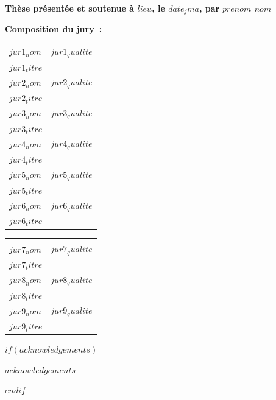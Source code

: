 \documentclass[12pt,a4paper]{reedthesis}
\begin{document}
\begin{titlepage}
\vspace{10mm}

\textbf{Thèse présentée et soutenue à $lieu$, le $date_jma$, par}
\bigskip
\Large {\color{Prune} \textbf{$prenom$ $nom$}}

\vspace{15mm}

\flushleft \normalsize \textbf{Composition du jury~:}
\bigskip

\scriptsize
{}
\begin{tabular}{|p{8cm}l}
\textbf{$jur1_nom$} &  $jur1_qualite$\\
$jur1_titre$ & \\
\textbf{$jur2_nom$} &  $jur2_qualite$\\
$jur2_titre$ & \\
\textbf{$jur3_nom$} &  $jur3_qualite$\\
$jur3_titre$ & \\
\textbf{$jur4_nom$} &  $jur4_qualite$\\
$jur4_titre$ & \\
\textbf{$jur5_nom$} &  $jur5_qualite$\\
$jur5_titre$ & \\
\textbf{$jur6_nom$} &  $jur6_qualite$\\
$jur6_titre$ & \\
\end{tabular}

\begin{tabular}{p{8cm}l}
& \\
\textbf{$jur7_nom$} &  $jur7_qualite$\\
$jur7_titre$ & \\
\textbf{$jur8_nom$} &  $jur8_qualite$\\
$jur8_titre$ & \\
\textbf{$jur9_nom$} &  $jur9_qualite$\\
$jur9_titre$ & \\
\end{tabular}

\end{titlepage}

\addamargin %

\frontmatter %
\pagestyle{empty} %

$if(acknowledgements)$
  \begin{acknowledgements}
    $acknowledgements$
  \end{acknowledgements}
$endif$
\end{document}
